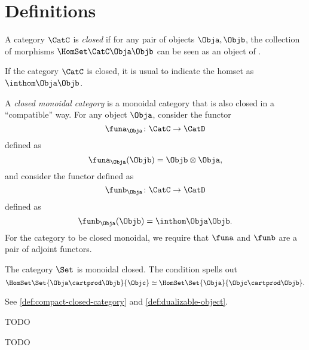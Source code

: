 \section{Definitions}

\begin{definition}
    \label{def:closed-category}
    A category $\CatC$ is \emph{closed} if for any pair of objects $\Obja,\Objb$,
    the collection of morphisms $\HomSet\CatC\Obja\Objb$ can be seen as an object of
    \CatC.

    If the category $\CatC$ is closed, it is usual to indicate the homset as $\inthom\Obja\Objb$.

\end{definition}

\begin{definition}
    \label{def:closed-monoidal-category}
    A \emph{closed monoidal category} is a monoidal category that is also closed
    in a ``compatible'' way.
    For any object $\Obja$, consider the functor
    \begin{equation}
        \funa_{\Obja} \colon \CatC \to \CatD
    \end{equation}
    defined as
    \begin{equation}
        \funa_{\Obja}(\Objb) = \Objb \otimes \Obja,
    \end{equation}
    and consider the functor defined as
    \begin{equation}
        \funb_{\Obja} \colon \CatC \to \CatD
    \end{equation}
    defined as
    \begin{equation}
        \funb_{\Obja}(\Objb) = \inthom\Obja\Objb.
    \end{equation}
    For the category to be closed monoidal, we require that $\funa$ and $\funb$ are a pair of adjoint functors.
\end{definition}

\begin{example}
    The category $\Set$ is monoidal closed.
    The condition
    spells out
    \begin{equation}
        \HomSet\Set{\Obja\cartprod\Objb}{\Objc} \simeq \HomSet\Set{\Obja}{\Objc\cartprod\Objb}.
    \end{equation}

\end{example}

See \cref{def:compact-closed-category} and \cref{def:dualizable-object}.

%
%

\begin{definition}
    \label{def:autonomous-category}
    TODO
\end{definition}

\begin{definition}
    \label{def:star-autonomous-category}
    TODO
\end{definition}
